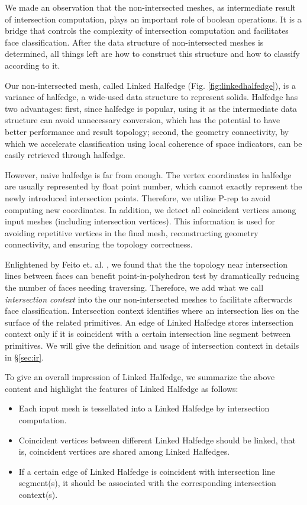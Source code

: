 \documentclass[10pt,journal,compsoc]{IEEEtran}
\begin{document}
\label{sec:meshes}
We made an observation that the non-intersected meshes, as intermediate result of intersection computation, plays an important role of boolean operations. It is a bridge that controls the complexity of intersection computation and facilitates face classification. After the data structure of non-intersected meshes is determined, all things left are how to construct this structure and how to classify according to it.

Our non-intersected mesh, called Linked Halfedge (Fig. \ref{fig:linkedhalfedge}), is a variance of halfedge, a wide-used data structure to represent solids. Halfedge has two advantages: first, since halfedge is popular, using it as the intermediate data structure can avoid unnecessary conversion, which has the potential to have better performance and result topology; second, the geometry connectivity, by which we accelerate classification using local coherence of space indicators, can be easily retrieved through halfedge.

However, naive halfedge is far from enough. The vertex coordinates in halfedge are usually represented by float point number, which cannot exactly represent the newly introduced intersection points. Therefore, we utilize P-rep to avoid computing new coordinates. In addition, we detect all coincident vertices among input meshes (including intersection vertices). This information is used for avoiding repetitive vertices in the final mesh, reconstructing geometry connectivity, and ensuring the topology correctness.

Enlightened by Feito et. al. \cite{feito2013fast}, we found that the the topology near intersection lines between faces can benefit point-in-polyhedron test by dramatically reducing the number of faces needing traversing. Therefore, we add what we call \emph{intersection context} into the our non-intersected meshes to facilitate afterwards face classification. Intersection context identifies where an intersection lies on the surface of the related primitives. An edge of Linked Halfedge stores intersection context only if it is coincident with a certain intersection line segment between primitives. We will give the definition and usage of intersection context in details in \S\ref{sec:ir}.

To give an overall impression of Linked Halfedge, we summarize the above content and highlight the features of Linked Halfedge as follows:

\begin{itemize}
  \item Each input mesh is tessellated into a Linked Halfedge by intersection computation.
  \item Coincident vertices between different Linked Halfedge should be linked, that is, coincident vertices are shared among Linked Halfedges.
  \item If a certain edge of Linked Halfedge is coincident with intersection line segment(s), it should be associated with the corresponding intersection context(s).
\end{itemize}
\end{document}
